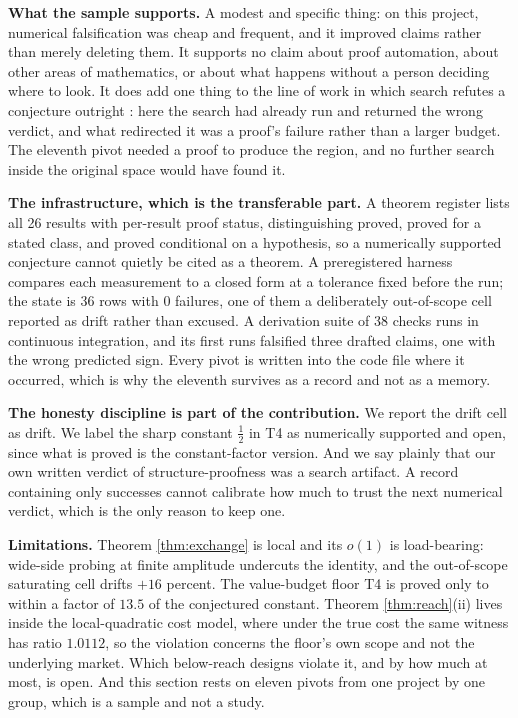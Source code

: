 \documentclass{article}
\begin{document}
\textbf{What the sample supports.} A modest and specific thing: on this
project, numerical falsification was cheap and frequent, and it improved
claims rather than merely deleting them. It supports no claim about proof
automation, about other areas of mathematics, or about what happens without a
person deciding where to look. It does add one thing to the line of work in
which search refutes a conjecture outright
\citep{wagner2021constructions,romera2024mathematical}: here the search had
already run and returned the wrong verdict, and what redirected it was a
proof's failure rather than a larger budget. The eleventh pivot needed a proof
to produce the region, and no further search inside the original space would
have found it.

\textbf{The infrastructure, which is the transferable part.} A theorem
register lists all 26 results with per-result proof status, distinguishing
proved, proved for a stated class, and proved conditional on a hypothesis, so
a numerically supported conjecture cannot quietly be cited as a theorem. A
preregistered harness compares each measurement to a closed form at a
tolerance fixed before the run; the state is 36 rows with 0 failures, one of
them a deliberately out-of-scope cell reported as drift rather than excused.
A derivation suite of 38 checks runs in continuous integration, and its first
runs falsified three drafted claims, one with the wrong predicted sign. Every
pivot is written into the code file where it occurred, which is why the
eleventh survives as a record and not as a memory.

\textbf{The honesty discipline is part of the contribution.} We report the
drift cell as drift. We label the sharp constant $\tfrac12$ in T4 as
numerically supported and open, since what is proved is the constant-factor
version. And we say plainly that our own written verdict of
structure-proofness was a search artifact. A record containing only successes
cannot calibrate how much to trust the next numerical verdict, which is the
only reason to keep one.

\textbf{Limitations.}\label{sec:limits} Theorem \ref{thm:exchange} is local
and its $o(1)$ is load-bearing: wide-side probing at finite amplitude
undercuts the identity, and the out-of-scope saturating cell drifts $+16$
percent. The value-budget floor T4 is proved only to within a factor of
$13.5$ of the conjectured constant. Theorem \ref{thm:reach}(ii) lives inside
the local-quadratic cost model, where under the true cost the same witness
has ratio $1.0112$, so the violation concerns the floor's own scope and not
the underlying market. Which below-reach designs violate it, and by how much
at most, is open. And this section rests on eleven pivots from one project by
one group, which is a sample and not a study.
\end{document}
